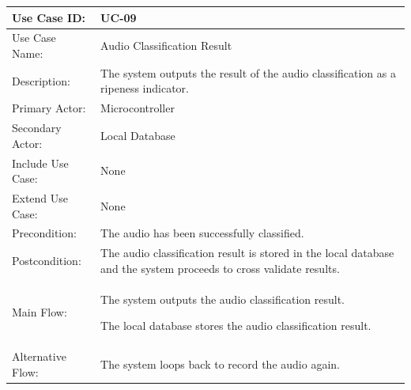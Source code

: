 \begin{thesisprose}
\FloatBarrier
\begingroup
\small
\setlength{\tabcolsep}{3pt}
\renewcommand{\arraystretch}{1.14}
\setlength{\arrayrulewidth}{0.625pt}
\def\LTcaptype{uncaptionedgrid}
\begin{longtable}{|>{\raggedright\arraybackslash}p{}|>{\raggedright\arraybackslash}p{}|}
\hline
Use Case ID: & UC-09 \\
\hline
Use Case Name: & Audio Classification Result \\
\hline
Description: & The system outputs the result of the audio classification as a ripeness indicator. \\
\hline
Primary Actor: & Microcontroller \\
\hline
Secondary Actor: & Local Database \\
\hline
Include Use Case: & None \\
\hline
Extend Use Case: & None \\
\hline
Precondition: & The audio has been successfully classified. \\
\hline
Postcondition: & The audio classification result is stored in the local database and the system proceeds to cross validate results. \\
\hline
Main Flow: & The system outputs the audio classification result.\par The local database stores the audio classification result. \\
\hline
Alternative Flow: & The system loops back to record the audio again. \\
\hline
\end{longtable}
\endgroup


\end{thesisprose}
